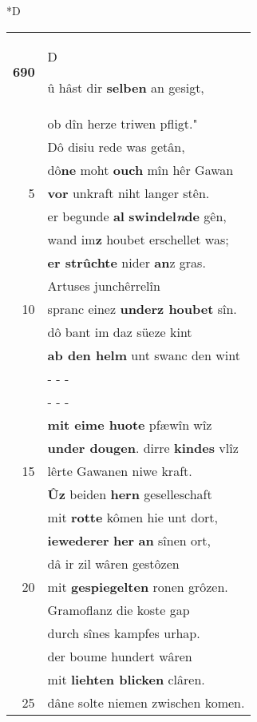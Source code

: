 \documentclass[8pt,a4paper,notitlepage]{article}
\begin{document}
\begin{table}[ht]
\begin{minipage}[t]{0.5\linewidth}
\small
\begin{center}*D
\end{center}
\begin{tabular}{rl}
\textbf{690} & \begin{large}D\end{large}û hâst dir \textbf{selben} an gesigt,\\ 
 & ob dîn herze triwen pfligt."\\ 
 & Dô disiu rede was getân,\\ 
 & dô\textbf{ne} moht \textbf{ouch} mîn hêr Gawan\\ 
5 & \textbf{vor} unkraft niht langer stên.\\ 
 & er begunde \textbf{al} \textbf{swindel\textit{n}de} gên,\\ 
 & wand im\textbf{z} houbet erschellet was;\\ 
 & \textbf{er strûchte} nider \textbf{an}z gras.\\ 
 & Artuses junchêrrelîn\\ 
10 & spranc einez \textbf{underz houbet} sîn.\\ 
 & dô bant im daz süeze kint\\ 
 & \textbf{ab den helm} unt swanc den wint\\ 
 & \multicolumn{1}{l}{ - - - }\\ 
 & \multicolumn{1}{l}{ - - - }\\ 
 & \textbf{mit eime huote} pfæwîn wîz\\ 
 & \textbf{under dougen}. dirre \textbf{kindes} vlîz\\ 
15 & lêrte Gawanen niwe kraft.\\ 
 & \textbf{Ûz} beiden \textbf{hern} geselleschaft\\ 
 & mit \textbf{rotte} kômen hie unt dort,\\ 
 & \textbf{iewederer} \textbf{her} \textbf{an} sînen ort,\\ 
 & dâ ir zil wâren gestôzen\\ 
20 & mit \textbf{gespiegelten} ronen grôzen.\\ 
 & Gramoflanz die koste gap\\ 
 & durch sînes kampfes urhap.\\ 
 & der boume hundert wâren\\ 
 & mit \textbf{liehten blicken} clâren.\\ 
25 & dâne solte niemen zwischen komen.\\ 

\end{tabular}
\end{minipage}
\end{table}
\end{document}
